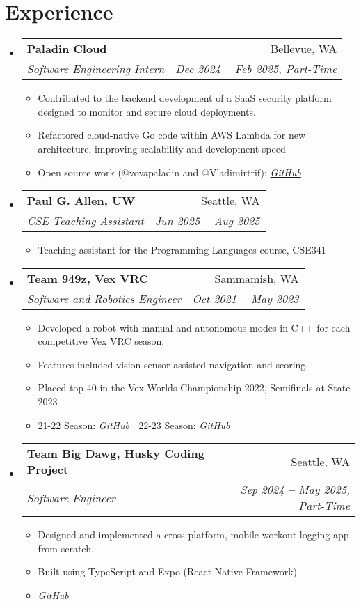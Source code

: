 \documentclass[letterpaper,11pt]{article}
\makeatletter
\newcommand{\resumeItem}[1]{
  \item\small{
    {#1 \vspace{-2pt}}
  }
}
\newcommand{\resumeSubheading}[4]{
  \vspace{-2pt}\item
    \begin{tabular*}{0.97\textwidth}[t]{l@{\extracolsep{\fill}}r}
      \textbf{#1} & #2 \\
      \textit{\small#3} & \textit{\small #4} \\
    \end{tabular*}\vspace{-7pt}
}
\newcommand{\resumeSubHeadingListStart}{\begin{itemize}[leftmargin=0.15in, label={}]}
\newcommand{\resumeSubHeadingListEnd}{\end{itemize}}
\newcommand{\resumeItemListStart}{\begin{itemize}}
\newcommand{\resumeItemListEnd}{\end{itemize}\vspace{-5pt}}
\makeatother
\begin{document}

\section{Experience}
  \vspace{3pt}
  \resumeSubHeadingListStart

  \resumeSubheading
    {Paladin Cloud}{Bellevue, WA}
    {Software Engineering Intern}{Dec 2024 \textbf{--} Feb 2025, Part-Time}
      \resumeItemListStart
          \resumeItem{Contributed to the backend development of a SaaS security platform designed to monitor and secure cloud deployments.}
          \resumeItem{Refactored cloud-native Go code within AWS Lambda for new architecture, improving scalability and development speed}
          \resumeItem{Open source work (@vovapaladin and @Vladimirtrif): \emph{\href{https://github.com/PaladinCloud/ce-extensions}{\color{blue}GitHub}} }
      \resumeItemListEnd

      \resumeSubheading
    {Paul G. Allen, UW}{Seattle, WA}
    {CSE Teaching Assistant}{Jun 2025 \textbf{--} Aug 2025}
      \resumeItemListStart
          \resumeItem{Teaching assistant for the Programming Languages course, CSE341}
      \resumeItemListEnd  

    \resumeSubheading
    {Team 949z, Vex VRC}{Sammamish, WA}
    {Software and Robotics Engineer}{Oct 2021 \textbf{--} May 2023}
      \resumeItemListStart
          \resumeItem{Developed a robot with manual and autonomous modes in C++ for each competitive Vex VRC season.}
          \resumeItem{Features included vision-sensor-assisted navigation and scoring.}
          \resumeItem{Placed top 40 in the Vex Worlds Championship 2022, Semifinals at State 2023}
          \resumeItem{21-22 Season: \emph{\href{https://github.com/Vladimirtrif/Team-949z_Pelmen_Vex_21-22}{\color{blue}GitHub}} 
          $|$  22-23 Season: \emph{\href{https://github.com/Vladimirtrif/Team-949z_Vex_22-23}{\color{blue}GitHub}} }
      \resumeItemListEnd

    \resumeSubheading
    {Team Big Dawg, Husky Coding Project}{Seattle, WA}
    {Software Engineer}{Sep 2024 \textbf{--} May 2025, Part-Time}
      \resumeItemListStart
          \resumeItem{Designed and implemented a cross-platform, mobile workout logging app from scratch.}
          \resumeItem{Built using TypeScript and Expo (React Native Framework)}
          \resumeItem{\emph{\href{https://github.com/Vladimirtrif/big-dawg}{\color{blue}GitHub}} }
      \resumeItemListEnd
  \resumeSubHeadingListEnd
\end{document}
